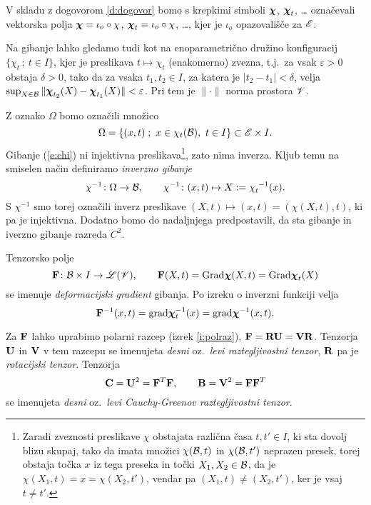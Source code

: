 V skladu z dogovorom \ref{d:dogovor} bomo s krepkimi simboli $\boldsymbol \chi$, $\boldsymbol \chi_t$, \dots
označevali vektorska polja $\boldsymbol \chi=\iota_o\circ\chi$, $\boldsymbol \chi_t=\iota_o\circ\chi$, \dots,
kjer je $\iota_o$ opazovališče za $\mathscr E$.

Na gibanje lahko gledamo tudi kot na enoparametrično družino konfiguracij
$\{ \chi_t\,;\ t\in I \}$, kjer je preslikava $t\mapsto\chi_t$ (enakomerno) zvezna,
t.j.~za vsak $\varepsilon>0$ obstaja $\delta>0$, tako da za vsaka $t_1,t_2\in I$,
za katera je $|t_2-t_1|<\delta$, velja $\sup_{X\in\mathcal B}\|\boldsymbol \chi_{t_2}(X)-\boldsymbol \chi_{t_1}(X)\|<\varepsilon$.
Pri tem je $\|\cdot\|$ norma prostora $\mathscr V$.

Z oznako $\Omega$ bomo označili množico
\[ \Omega=\{(x,t)\;;\ x\in\chi_t(\B),\ t\in I\}\subset\E\times I. \]
Gibanje (\ref{e:chi}) ni injektivna preslikava\footnote{Zaradi zveznosti preslikave $\chi$
obstajata različna časa $t,t'\in I$, ki sta dovolj blizu skupaj, tako da imata množici $\chi(\mathcal B,t)$
in $\chi(\mathcal B,t')$ neprazen presek, torej obstaja točka $x$ iz tega preseka in točki $X_1,X_2\in\mathcal B$,
da je $\chi(X_1,t)=x=\chi(X_2,t')$, vendar pa $(X_1,t)\neq(X_2,t')$, ker je vsaj $t\neq t'$.},
zato nima inverza. Kljub temu na smiselen način definiramo \emph{inverzno gibanje}
\[
	\chi^{-1}\colon\Omega\to \B,\qquad
	\chi^{-1}\colon(x,t)\mapsto X:=\bottop{\chi}{t}{-1}(x).
\]
S $\chi^{-1}$ smo torej označili inverz preslikave $(X,t)\mapsto(x,t)=(\chi(X,t),t)$,
ki pa je injektivna.
Dodatno bomo do nadaljnjega predpostavili, da sta gibanje in iverzno gibanje razreda $C^2$.

Tenzorsko polje
\[
	\mathbf F\colon \mathcal B\times I\to\mathscr L(\mathscr V),\qquad \mathbf F(X,t)=\mathrm{Grad}\boldsymbol \chi(X,t)=\mathrm{Grad}\boldsymbol \chi_t(X)
\]
se imenuje \emph{deformacijski gradient} gibanja. Po izreku o inverzni funkciji velja
\[
	\mathbf F^{-1}(x,t)=\mathrm{grad}\boldsymbol \chi_t^{-1}(x)=\mathrm{grad}\boldsymbol \chi^{-1}(x,t).
\]

Za $\mathbf F$ lahko uprabimo polarni razcep (izrek \ref{i:polraz}), $\mathbf F=\mathbf R\mathbf U=\mathbf V\mathbf R$.
Tenzorja $\mathbf U$ in $\mathbf V$ v tem razcepu se imenujeta \emph{desni} oz.~\emph{levi raztegljivostni
tenzor}, $\mathbf R$ pa je \emph{rotacijski tenzor}. Tenzorja
\[
	\mathbf C=\mathbf U^2=\mathbf F^T\mathbf F,\qquad\mathbf B=\mathbf V^2=\mathbf F\mathbf F^T
\]
se imenujeta \emph{desni} oz.~\emph{levi Cauchy-Greenov raztegljivostni tenzor}.


